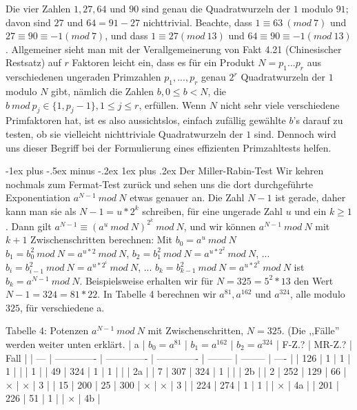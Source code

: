 \documentclass[a4paper]{article}
\makeatletter
\renewcommand{\subsubsection}{\@startsection{subsubsection}{3}{0mm}%
 {-1ex plus -.5ex minus -.2ex}%
 {1ex plus .2ex}%
 {\normalfont\small\bfseries}}
\makeatother
\begin{document}
\begin{multicols}{3}
        Die vier Zahlen $1, 27, 64$ und $90$ sind genau die Quadratwurzeln der $1$ modulo $91$; davon sind $27$ und $64 = 91-27$ nichttrivial. Beachte, dass $1\equiv 63\ (mod\ 7)$ und $27\equiv 90 \equiv -1(mod\ 7)$, und dass $1\equiv 27 (mod\ 13)$ und $64\equiv 90 \equiv -1 (mod\ 13)$. Allgemeiner sieht man mit der Verallgemeinerung von Fakt 4.21 (Chinesischer Restsatz) auf $r$ Faktoren leicht ein, dass es für ein Produkt $N=p_1...p_r$ aus verschiedenen ungeraden Primzahlen $p_1,...,p_r$ genau $2^r$ Quadratwurzeln der $1$ modulo $N$ gibt, nämlich die Zahlen $b,0\leq b < N$, die $b\ mod\ p_j\in\{1 ,p_j-1\}, 1\leq j\leq r$, erfüllen. Wenn $N$ nicht sehr viele verschiedene Primfaktoren hat, ist es also aussichtslos, einfach zufällig gewählte $b$’s darauf zu testen, ob sie vielleicht nichttriviale Quadratwurzeln der $1$ sind. Dennoch wird uns dieser Begriff bei der Formulierung eines effizienten Primzahltests helfen.

        \subsubsection{Der Miller-Rabin-Test}
        Wir kehren nochmals zum Fermat-Test zurück und sehen uns die dort durchgeführte Exponentiation $a^{N-1}\ mod\ N$ etwas genauer an. Die Zahl $N-1$ ist gerade, daher kann man sie als $N-1=u*2^k$ schreiben, für eine ungerade Zahl $u$ und ein $k\geq 1$. Dann gilt $a^{N-1} \equiv (a^u\ mod\ N)^{2^k}\ mod\ N$, und wir können $a^{N-1}\ mod\ N$ mit $k+1$ Zwischenschritten berechnen: Mit
    $b_0 =a^u\ mod\ N$
    $b_1 =b^2_0\ mod\ N=a^{u*2}\ mod\ N$,
    $b_2 =b^2_1\ mod\ N=a^{u*2^2}\ mod\ N$,
        ...
    $b_i=b^2_{i-1}\ mod\ N=a^{u*2^i}\ mod\ N$,
        ...
    $b_k=b^2_{k-1}\ mod\ N=a^{u*2^k}\ mod\ N$
        ist $b_k=a^{N-1}\ mod\ N$. Beispielsweise erhalten wir für $N=325 = 5^2 *13$ den Wert $N-1 = 324 = 81* 22$. In Tabelle 4 berechnen wir $a^{81} ,a^{162}$ und $a^{324}$, alle modulo $325$, für verschiedene a.

        Tabelle 4: Potenzen $a^{N-1}\ mod\ N$ mit Zwischenschritten, $N=325$. (Die ,,Fälle'' werden weiter unten erklärt.
        | a   | $b_0 =a^{81}$ | $b_1=a^{162}$ | $b_2=a^{324}$ | F-Z.?    | MR-Z.?   | Fall |
        | --- | ------------- | ------------- | ------------- | -------- | -------- | ---- |
        | 126 | 1             | 1             | 1             |          |          | 1    |
        | 49  | 324           | 1             | 1             |          |          | 2a   |
        | 7   | 307           | 324           | 1             |          |          | 2b   |
        | 2   | 252           | 129           | 66            | $\times$ | $\times$ | 3    |
        | 15  | 200           | 25            | 300           | $\times$ | $\times$ | 3    |
        | 224 | 274           | 1             | 1             |          | $\times$ | 4a   |
        | 201 | 226           | 51            | 1             |          | $\times$ | 4b   |


\end{multicols}
\end{document}
